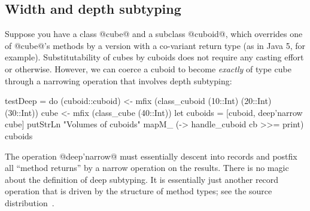  
\medskip

\subsection{Width and depth subtyping}
\label{A:deep}

Suppose you have a class @cube@ and a subclass @cuboid@, which
overrides one of @cube@'s methods by a version with a co-variant
return type (as in Java 5, for example). Substitutability of cubes by
cuboids does not require any casting effort or otherwise. However, we
can coerce a cuboid to become \emph{exactly} of type cube through a
narrowing operation that involves depth subtyping:

\begin{code}
 testDeep = do
   (cuboid::cuboid) <- mfix (class_cuboid
                         (10::Int) (20::Int) (30::Int))
   cube <- mfix (class_cube (40::Int))
   let cuboids = [cuboid, deep'narrow cube]
   putStrLn "Volumes of cuboids"
   mapM_ (\cb -> handle_cuboid cb >>= print) cuboids
\end{code}

The operation @deep'narrow@ must essentially descent into records and
postfix all ``method returns'' by a narrow operation on the results.
There is no magic about the definition of deep subtyping. It is
essentially just another record operation that is driven by the
structure of method types; see the source distribution~\cite{OOHaskell}.





